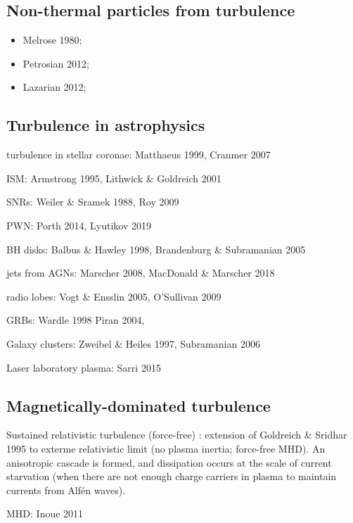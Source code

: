 \documentclass[usenatbib,twocolumn, twocolappendix]{aastex63}
\begin{document}
\begin{appendix}
\subsection{Non-thermal particles from turbulence}
\begin{itemize}
    \item Melrose 1980;
    \item Petrosian 2012;
    \item Lazarian 2012;
\end{itemize}

\subsection{Turbulence in astrophysics}

turbulence in stellar coronae:
Matthaeus 1999, Cranmer 2007

ISM:
Armstrong 1995, Lithwick \& Goldreich 2001

SNRs:
Weiler \& Sramek 1988, Roy 2009

PWN:
Porth 2014, Lyutikov 2019

BH disks:
Balbus \& Hawley 1998, Brandenburg \& Subramanian 2005

jets from AGNs:
Marscher 2008, MacDonald \& Marscher 2018
\citep{MacDonald_2018}

radio lobes:
Vogt \& Ensslin 2005, O'Sullivan 2009

GRBs:
Wardle 1998
Piran 2004, 
\citep{Kumar_2009}

Galaxy clusters:
Zweibel \& Heiles 1997, Subramanian 2006

Laser laboratory plasma:
Sarri 2015


\subsection{Magnetically-dominated turbulence}

Sustained relativistic turbulence (force-free)
\citep{Thompson_1998}: extension of Goldreich \& Sridhar 1995 to exterme relativistic limit (no plasma inertia; force-free MHD).
An anisotropic cascade is formed, and dissipation occurs at the scale of current starvation (when there are not enough charge carriers in plasma to maintain currents from Alf\'en waves).

MHD:
\citep{Cho_2005}
Inoue 2011
\citep{Cho_2014}
\citep{Zrake_2016}


\end{appendix}
\end{document}
